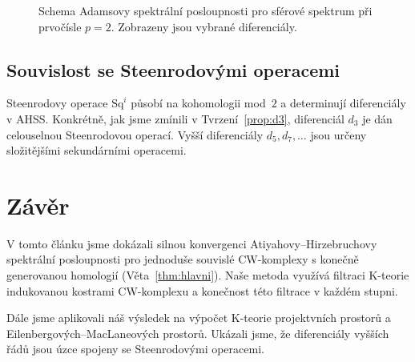 \documentclass[12pt,a4paper]{article}
\theoremstyle{plain}
\theoremstyle{definition}
\theoremstyle{remark}
\begin{document}
\begin{figure}[ht]
\centering
{}
\caption{Schema Adamsovy spektr\'{a}ln\'{i} posloupnosti pro sf\'{e}rov\'{e} spektrum
p\v{r}i prvo\v{c}\'{i}sle $p=2$. Zobrazeny jsou vybran\'{e} diferenci\'{a}ly.}
\label{fig:adams_s0}
\end{figure}

\subsection{Souvislost se Steenrodov\'{y}mi operacemi}

Steenrodovy operace $\mathrm{Sq}^i$ p\r{u}sob\'{i} na kohomologii
mod~$2$ a determinuj\'{i} diferenci\'{a}ly v AHSS. Konkr\'{e}tn\v{e},
jak jsme zm\'{i}nili v Tvrzen\'{i}~\ref{prop:d3}, diferenci\'{a}l $d_3$ je
d\'{a}n celouselnou Steenrodovou operac\'{i}. Vy\v{s}\v{s}\'{i} diferenci\'{a}ly
$d_5, d_7, \ldots$ jsou ur\v{c}eny slo\v{z}it\v{e}j\v{s}\'{i}mi sekund\'{a}rn\'{i}mi
operacemi.

\section{Z\'{a}v\v{e}r}
\label{sec:zaver}

V tomto \v{c}l\'{a}nku jsme dok\'{a}zali silnou konvergenci
Atiyahovy--Hirzebruchovy spektr\'{a}ln\'{i} posloupnosti pro jednodu\v{s}e
souvisl\'{e} CW-komplexy s kone\v{c}n\v{e} generovanou homologi\'{i}
(V\v{e}ta~\ref{thm:hlavni}). Na\v{s}e metoda vyu\v{z}\'{i}v\'{a} filtraci
K-teorie indukovanou kostrami CW-komplexu a kone\v{c}nost t\'{e}to
filtrace v ka\v{z}d\'{e}m stupni.

D\'{a}le jsme aplikovali n\'{a}\v{s} v\'{y}sledek na v\'{y}po\v{c}et K-teorie
projektvn\'{i}ch prostor\r{u} a Eilenbergov\'{y}ch--MacLaneov\'{y}ch prostor\r{u}.
Uk\'{a}zali jsme, \v{z}e diferenci\'{a}ly vy\v{s}\v{s}\'{i}ch \v{r}\'{a}d\r{u} jsou
\'{u}zce spojeny se Steenrodov\'{y}mi operacemi.
\end{document}
